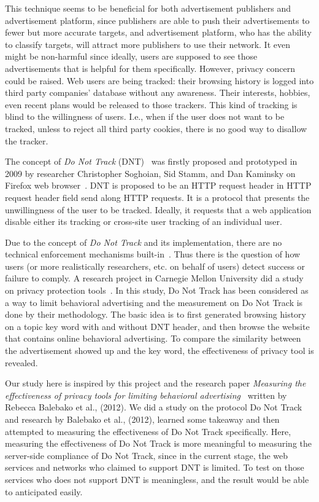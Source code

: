 \documentclass{sig-alternate}
\begin{document}
This technique seems to be beneficial for both advertisement publishers and advertisement platform, since publishers are able to push their advertisements to fewer but more accurate targets, and advertisement platform, who has the ability to classify targets, will attract more publishers to use their network. It even might be non-harmful since ideally, users are supposed to see those advertisements that is helpful for them specifically. However, privacy concern could be raised. Web users are being tracked: their browsing history is logged into third party companies' database without any awareness. Their interests, hobbies, even recent plans would be released to those trackers. This kind of tracking is blind to the willingness of users. I.e., when if the user does not want to be tracked, unless to reject all third party cookies, there is no good way to disallow the tracker.

The concept of \emph{Do Not Track} (DNT)~\cite{tschofenignot} was firstly proposed and prototyped in 2009 by researcher Christopher Soghoian, Sid Stamm, and Dan Kaminsky on Firefox web browser~\cite{wikidnt}. DNT is proposed to be an HTTP request header in HTTP request header field send along HTTP requests. It is a protocol that presents the unwillingness of the user to be tracked. Ideally, it requests that a web application disable either its tracking or cross-site user tracking of an individual user.

Due to the concept of \emph{Do Not Track} and its implementation, there are no technical enforcement mechanisms built-in~\cite{tschofenignot}. Thus there is the question of how users (or more realistically researchers, etc. on behalf of users) detect success or failure to comply. A research project in Carnegie Mellon University did a study on privacy protection tools~\cite{balebako2012measuring}. In this study, Do Not Track has been considered as a way to limit behavioral advertising and the measurement on Do Not Track is done by their methodology. The basic idea is to first generated browsing history on a topic key word with and without DNT header, and then browse the website that contains online behavioral advertising. To compare the similarity between the advertisement showed up and the key word, the effectiveness of privacy tool is revealed.

Our study here is inspired by this project and the research paper \emph{Measuring the effectiveness of privacy tools for limiting behavioral advertising}~\cite{balebako2012measuring} written by Rebecca Balebako et al., (2012). We did a study on the protocol Do Not Track and research by Balebako et al., (2012), learned some takeaway and then attempted to measuring the effectiveness of Do Not Track specifically. Here, measuring the effectiveness of Do Not Track is more meaningful to measuring the server-side compliance of Do Not Track, since in the current stage, the web services and networks who claimed to support DNT is limited. To test on those services who does not support DNT is meaningless, and the result would be able to anticipated easily.
\end{document}
